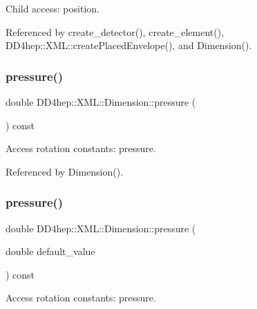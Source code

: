 Child access\+: position. 



Referenced by create\+\_\+detector(), create\+\_\+element(), D\+D4hep\+::\+X\+M\+L\+::create\+Placed\+Envelope(), and Dimension().

\hypertarget{struct_d_d4hep_1_1_x_m_l_1_1_dimension_aced260cb163faa0dca3a0d96eec58b40}{}\label{struct_d_d4hep_1_1_x_m_l_1_1_dimension_aced260cb163faa0dca3a0d96eec58b40} 
\subsubsection{\texorpdfstring{pressure()}{pressure()}\hspace{0.1cm}{\footnotesize\ttfamily [1/2]}}
{\footnotesize\ttfamily double D\+D4hep\+::\+X\+M\+L\+::\+Dimension\+::pressure (\begin{DoxyParamCaption}{ }\end{DoxyParamCaption}) const}



Access rotation constants\+: pressure. 



Referenced by Dimension().

\hypertarget{struct_d_d4hep_1_1_x_m_l_1_1_dimension_abea5761065256250c910a682adbf08f6}{}\label{struct_d_d4hep_1_1_x_m_l_1_1_dimension_abea5761065256250c910a682adbf08f6} 
\subsubsection{\texorpdfstring{pressure()}{pressure()}\hspace{0.1cm}{\footnotesize\ttfamily [2/2]}}
{\footnotesize\ttfamily double D\+D4hep\+::\+X\+M\+L\+::\+Dimension\+::pressure (\begin{DoxyParamCaption}\item[{double}]{default\+\_\+value }\end{DoxyParamCaption}) const}



Access rotation constants\+: pressure. 

\hypertarget{struct_d_d4hep_1_1_x_m_l_1_1_dimension_ab313a407cd67f48127b61e04d4583beb}{}\label{struct_d_d4hep_1_1_x_m_l_1_1_dimension_ab313a407cd67f48127b61e04d4583beb} 
